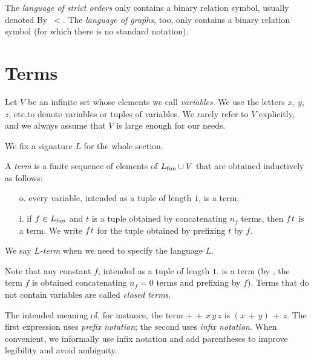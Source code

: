 \begin{example}\label{expl_graph1}
The \emph{language of strict orders\/} only contains a binary relation symbol, usually denoted By~$<$. The \emph{language of graphs\/}, too, only contains a binary relation symbol (for which there is no standard notation).\QED
\end{example}


\section{Terms}\label{terminidef}
Let \emph{$V$\/} be an infinite set whose elements we call \emph{variables}. We use the letters $x$, $y$, $z$, etc.\@ to denote variables or tuples of variables. We rarely refer to $V$ explicitly, and we always assume that $V$ is large enough for our needs.

We fix a signature $L$ for the whole section.

\begin{definition}\label{deftermine} 
A \emph{term\/} is a finite sequence of elements of $L_{\rm fun}\cup V$ that are obtained inductively as follows:
\begin{itemize}
\item[o.] every variable, intended as a tuple of length $1$, is a term;
\item[i.] if $f\in L_{\rm fun}$ and $t$ is a tuple obtained by concatenating $n_f$ terms, then $f\kern0.1ex t$ is a term. We write $f\kern0.1ex t$ for the tuple obtained by prefixing $t$ by $f$.
\end{itemize}
We say \emph{$L$-term\/} when we need to specify the language $L$.\QED
\end{definition}

Note that any constant $f$, intended as a tuple of length $1$, is a term (by , the term $f$ is obtained concatenating $n_f=0$ terms and prefixing by $f$). Terms that do not contain variables are called \emph{closed terms}.

The intended meaning of, for instance, the term ${+}\,{+}\,x\,y\,z$ is $(x\,{+}\,y)\,{+}\,z$. The first expression uses \emph{prefix notation\/}; the second uses \emph{infix notation}. When convenient, we informally use infix notation and add parentheses to improve legibility and avoid ambiguity.

